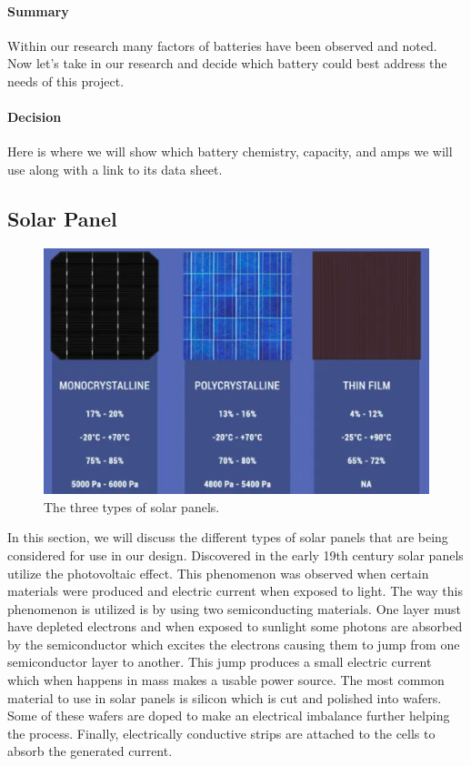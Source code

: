 \paragraph{Summary}
Within our research many factors of batteries have been observed and noted. Now let's take in our research and decide which battery could best address the needs of this project. 

\paragraph{Decision}
Here is where we will show which battery chemistry, capacity, and amps we will use along with a link to its data sheet. 

\subsection{Solar Panel}

\begin{figure}
    \centering
    \includegraphics[scale=0.25]{figures/solar panel overview.png}
    \caption{The three types of solar panels.}
    \label{solar-panel-overview} 
\end{figure}

In this section, we will discuss the different types of solar panels that are being considered for use in our design. Discovered in the early 19th century solar panels utilize the photovoltaic effect. This phenomenon was observed when certain materials were produced and electric current when exposed to light. The way this phenomenon is utilized is by using two semiconducting materials. One layer must have depleted electrons and when exposed to sunlight some photons are absorbed by the semiconductor which excites the electrons causing them to jump from one semiconductor layer to another. This jump produces a small electric current which when happens in mass makes a usable power source. The most common material to use in solar panels is silicon which is cut and polished into wafers. Some of these wafers are doped to make an electrical imbalance further helping the process. Finally, electrically conductive strips are attached to the cells to absorb the generated current. 


